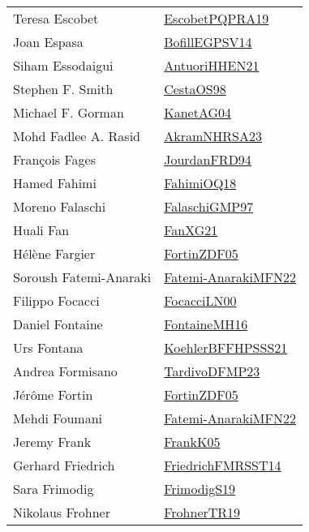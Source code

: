 {\begin{longtable}{p{4cm}p{20cm}}
Teresa Escobet & \href{articles/EscobetPQPRA19.pdf}{EscobetPQPRA19}\cite{EscobetPQPRA19} \\
Joan Espasa & \href{papers/BofillEGPSV14.pdf}{BofillEGPSV14}\cite{BofillEGPSV14} \\
Siham Essodaigui & \href{papers/AntuoriHHEN21.pdf}{AntuoriHHEN21}\cite{AntuoriHHEN21} \\
Stephen F. Smith & \href{papers/CestaOS98.pdf}{CestaOS98}\cite{CestaOS98} \\
Michael F. Gorman & \href{}{KanetAG04}\cite{KanetAG04} \\
Mohd Fadlee A. Rasid & \href{articles/AkramNHRSA23.pdf}{AkramNHRSA23}\cite{AkramNHRSA23} \\
Fran{\c{c}}ois Fages & \href{}{JourdanFRD94}\cite{JourdanFRD94} \\
Hamed Fahimi & \href{articles/FahimiOQ18.pdf}{FahimiOQ18}\cite{FahimiOQ18} \\
Moreno Falaschi & \href{articles/FalaschiGMP97.pdf}{FalaschiGMP97}\cite{FalaschiGMP97} \\
Huali Fan & \href{articles/FanXG21.pdf}{FanXG21}\cite{FanXG21} \\
H{\'{e}}l{\`{e}}ne Fargier & \href{papers/FortinZDF05.pdf}{FortinZDF05}\cite{FortinZDF05} \\
Soroush Fatemi-Anaraki & \href{}{Fatemi-AnarakiMFN22}\cite{Fatemi-AnarakiMFN22} \\
Filippo Focacci & \href{papers/FocacciLN00.pdf}{FocacciLN00}\cite{FocacciLN00} \\
Daniel Fontaine & \href{papers/FontaineMH16.pdf}{FontaineMH16}\cite{FontaineMH16} \\
Urs Fontana & \href{articles/KoehlerBFFHPSSS21.pdf}{KoehlerBFFHPSSS21}\cite{KoehlerBFFHPSSS21} \\
Andrea Formisano & \href{papers/TardivoDFMP23.pdf}{TardivoDFMP23}\cite{TardivoDFMP23} \\
J{\'{e}}r{\^{o}}me Fortin & \href{papers/FortinZDF05.pdf}{FortinZDF05}\cite{FortinZDF05} \\
Mehdi Foumani & \href{}{Fatemi-AnarakiMFN22}\cite{Fatemi-AnarakiMFN22} \\
Jeremy Frank & \href{papers/FrankK05.pdf}{FrankK05}\cite{FrankK05} \\
Gerhard Friedrich & \href{}{FriedrichFMRSST14}\cite{FriedrichFMRSST14} \\
Sara Frimodig & \href{papers/FrimodigS19.pdf}{FrimodigS19}\cite{FrimodigS19} \\
Nikolaus Frohner & \href{papers/FrohnerTR19.pdf}{FrohnerTR19}\cite{FrohnerTR19} \\

\end{longtable}}
